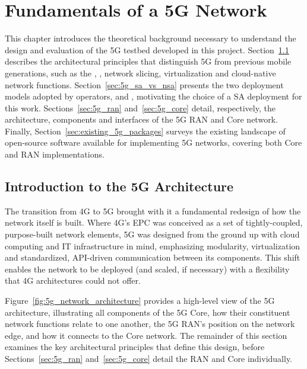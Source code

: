%

\chapter{Fundamentals of a 5G Network}
\label{cha:5g-fundamentals}
This chapter introduces the theoretical background necessary to understand the design and evaluation of the 5G testbed developed in this project. Section~\ref{sec:introduction_5g_architecture} describes the architectural principles that distinguish 5G from previous mobile generations, such as the , , network slicing, virtualization and cloud-native network functions. Section~\ref{sec:5g_sa_vs_nsa} presents the two deployment models adopted by operators,  and , motivating the choice of a \gls{SA} deployment for this work. Sections~\ref{sec:5g_ran} and~\ref{sec:5g_core} detail, respectively, the architecture, components and interfaces of the 5G \gls{RAN} and Core network. Finally, Section~\ref{sec:existing_5g_packages} surveys the existing landscape of open-source software available for implementing 5G networks, covering both Core and \gls{RAN} implementations.

\section{Introduction to the 5G Architecture}
\label{sec:introduction_5g_architecture}
The transition from 4G to 5G brought with it a fundamental redesign of how the network itself is built. Where 4G's \gls{EPC} was conceived as a set of tightly-coupled, purpose-built network elements, 5G was designed from the ground up with cloud computing and IT infrastructure in mind, emphasizing modularity, virtualization and standardized, API-driven communication between its components. This shift enables the network to be deployed (and scaled, if necessary) with a flexibility that 4G architectures could not offer.

Figure~\ref{fig:5g_network_architecture} provides a high-level view of the 5G architecture, illustrating all components of the 5G Core, how their constituent network functions relate to one another, the 5G \gls{RAN}'s position on the network edge, and how it connects to the Core network. The remainder of this section examines the key architectural principles that define this design, before Sections~\ref{sec:5g_ran} and~\ref{sec:5g_core} detail the \gls{RAN} and Core individually.

